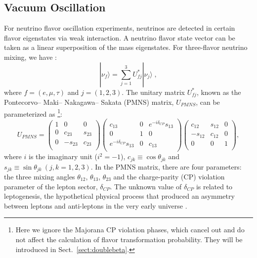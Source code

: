 \subsection{Vacuum Oscillation}\label{sect:VacuumOsci}
For neutrino flavor oscillation experiments, neutrinos are detected in certain flavor eigenstates via weak interaction. A neutrino flavor state vector can be taken as a linear superposition of the mass eigenstates. For three-flavor neutrino mixing, we have \cite{pdg2020}:
\begin{equation}\label{eq:mixingmatrix}
|\nu_f\rangle = \sum_{j=1}^3U^*_{fj}|\nu_j\rangle \;, 
\end{equation}
where $f=(e,\mu,\tau)$ and $j=(1,2,3)$. The unitary matrix $U^*_{fj}$, known as the Pontecorvo– Maki– Nakagawa– Sakata (PMNS) matrix, $U_{PMNS}$, can be parameterized as \footnote{Here we ignore the Majorana CP violation phases, which cancel out and do not affect the calculation of flavor transformation probability. They will be introduced in Sect.~\ref{sect:doublebeta}.}: 
\begin{equation}\label{eq:uPMNS}
U_{PMNS} =
\begin{pmatrix}
1 &0 &0\\
0 &c_{23} &s_{23}\\
0 &-s_{23} &c_{23}\\ 
\end{pmatrix}
\begin{pmatrix}
c_{13} &0 &e^{-i\delta_{CP}}s_{13}\\
0 &1 &0\\
e^{-i\delta_{CP}}s_{13} &0 &c_{13}\\ 
\end{pmatrix}
\begin{pmatrix}
c_{12} &s_{12} &0\\
-s_{12} &c_{12} &0\\
0 &0 &1\\ 
\end{pmatrix},
\end{equation}
where $i$ is the imaginary unit ($i^2=-1$), $c_{jk}\equiv \cos\theta_{jk}$ and $s_{jk}\equiv \sin\theta_{jk}~(j,k = 1,2,3)$. In the PMNS matrix, there are four parameters: the three mixing angles $\theta_{12}$, $\theta_{13}$, $\theta_{23}$ and the charge-parity (CP) violation parameter of the lepton sector, $\delta_{CP}$. The unknown value of $\delta_{CP}$ is related to leptogenesis, the hypothetical physical process that produced an asymmetry between leptons and anti-leptons in the very early universe \cite{wiki_cp}. 

